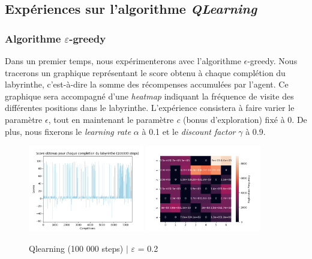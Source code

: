 \documentclass{article}
\begin{document}
\subsection{Expériences sur l'algorithme \textit{QLearning}}

\subsubsection{Algorithme $\varepsilon$-greedy}
\label{subsubsec:egreedy}

\noindent Dans un premier temps, nous expérimenterons avec l'algorithme $\epsilon$-greedy. Nous tracerons un graphique représentant le score obtenu à chaque complétion du labyrinthe, c'est-à-dire la somme des récompenses accumulées par l'agent. Ce graphique sera accompagné d'une \textit{heatmap} indiquant la fréquence de visite des différentes positions dans le labyrinthe. L'expérience consistera à faire varier le paramètre $\epsilon$, tout en maintenant le paramètre \textit{c} (bonus d'exploration) fixé à 0. De plus, nous fixerons le \textit{learning rate} $\alpha$ à 0.1 et le \textit{discount factor} $\gamma$ à 0.9.

\begin{figure}[H]
    \centering
    {%
        \includegraphics[width=0.45\textwidth]{src/qlearning/greedy/greedy02.png}
    }\hfill
    {%
        \includegraphics[width=0.45\textwidth]{src/qlearning/greedy/greedy02heatmap.png}
    }
    \caption{Qlearning (100 000 steps) $|$ $\varepsilon$ = 0.2}
    \label{fig:egreedy02}
\end{figure}
\end{document}
